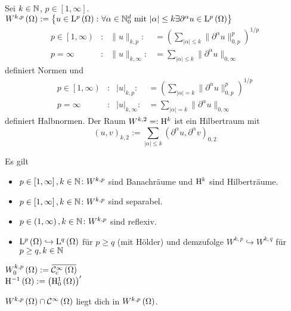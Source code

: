 \begin{definition}
	Sei $k\in\mathbb{N}$, $p\in\left[1,\infty\right]$.\\
	$W^{k,p}\left(\Omega\right):=\left\{u\in\mathrm{L}^{p}\left(\Omega\right)\colon \forall\alpha\in\mathbb{N}_{0}^{d}\text{ mit }|\alpha|\leq k \exists\partial^{\alpha}u\in\mathrm{L}^{p}\left(\Omega\right)\right\}$
	\begin{align*}
		p\in\left[1,\infty\right)&: &\|u\|_{k,p} :&= \left(\sum_{|\alpha|\leq k}\|\partial^{\alpha}u\|_{0,p}^{p}\right)^{1/p}\\
		p=\infty&: &\|u\|_{k,\infty} :&= \sum_{|\alpha|\leq k}\|\partial^{\alpha}u\|_{0,\infty}
	\end{align*}
	definiert Normen und
	\begin{align*}
		p\in\left[1,\infty\right)&: &|u|_{k,p} :&= \left(\sum_{|\alpha|= k}\|\partial^{\alpha}u\|_{0,p}^{p}\right)^{1/p}\\
		p=\infty&: &|u|_{k,\infty} :&= \sum_{|\alpha|= k}\|\partial^{\alpha}u\|_{0,\infty}
	\end{align*}
	definiert Halbnormen. Der Raum $W^{k,2} =:\mathrm{H}^{k}$ ist ein Hilbertraum mit
	\begin{equation*}
		\left(u,v\right)_{k,2} := \sum_{|\alpha|\leq k}\left(\partial^{\alpha}u,\partial^{\alpha}v\right)_{0,2}
	\end{equation*}
\end{definition}

Es gilt
\begin{itemize}
	\item $p\in\left[1,\infty\right], k\in\mathbb{N}\colon W^{k,p}$ sind Banachräume und $\mathrm{H}^{k}$ sind Hilberträume.
	\item $p\in\left[1,\infty\right], k\in\mathbb{N}\colon W^{k,p}$ sind separabel.
	\item $p\in\left(1,\infty\right), k\in\mathbb{N}\colon W^{k,p}$ sind reflexiv.
	\item $\mathrm{L}^{p}\left(\Omega\right)\hookrightarrow\mathrm{L}^{q}\left(\Omega\right)$ für $p\geq q$ (mit Hölder) und demzufolge $W^{k,p}\hookrightarrow W^{k,q}$ für $p\geq q, k\in\mathbb{N}$
\end{itemize}

\begin{definition}
	$W^{k,p}_{0}\left(\W\right) := \overbar{\C^{\infty}_{\text{c}}\left(\W\right)}$\\
	$\mathrm{H}^{-1}\left(\Omega\right) := \left(\mathrm{H}^{1}_{0}\left(\Omega\right)\right)^{\prime}$
\end{definition}

\begin{lemma}[Satz]
	$W^{k,p}\left(\Omega\right)\cap\mathcal{C}^{\infty}\left(\Omega\right)$ liegt dich in $W^{k,p}\left(\Omega\right)$.
\end{lemma}

